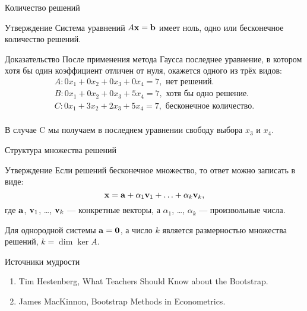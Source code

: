 \begin{frame}{Количество решений}
\begin{block}{Утверждение}
Система уравнений $A \mathbf{x} = \mathbf{b}$ имеет ноль, одно или бесконечное количество решений. 
\end{block}
\pause

\begin{block}{Доказательство}
После применения метода Гаусса последнее уравнение, в котором хотя бы один коэффициент 
отличен от нуля, окажется одного из трёх видов:
\[
\begin{array}{l}
A: 0x_1 + 0x_2 + 0x_3 + 0x_4 = 7, \text{ нет решений.}\\    
B: 0x_1 + 0x_2 + 0x_3 + 5x_4 = 7, \text{ хотя бы одно решение.} \\
C: 0x_1 + 3x_2 + 2x_3 + 5x_4 = 7, \text{ бесконечное количество.} \\
\end{array}
\]
\end{block}
\pause

В случае C мы получаем в последнем уравнении свободу выбора $x_3$ и $x_4$.

\end{frame}



\begin{frame}{Структура множества решений}

\begin{block}{Утверждение}
Если решений бесконечное множество, то ответ можно записать в виде:
\[
\mathbf{x} = \mathbf{a} + \alpha_1 \mathbf{v}_1 + \ldots + \alpha_k \mathbf{v}_k,
\]
где $\mathbf{a}$, $\mathbf{v}_1$, \ldots, $\mathbf{v}_k$ — конкретные векторы, а
$\alpha_1$, \ldots, $\alpha_k$ — произвольные числа. 
\end{block}

\pause
Для однородной системы $\mathbf{a}=\mathbf{0}$, 
    а число $k$ является размерностью множества решений, $k=\dim\ker A$.

\end{frame}




\begin{frame}{Источники мудрости}

\begin{enumerate}[<+->]
    \item Tim Hestenberg, What Teachers Should Know about the Bootstrap.
    \item James MacKinnon, Bootstrap Methods in Econometrics.
\end{enumerate}

\end{frame}


